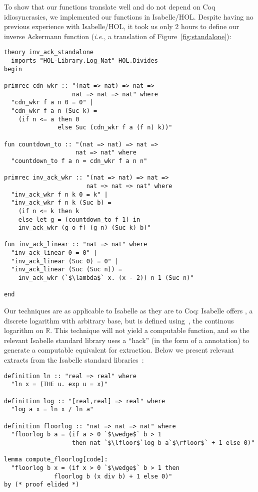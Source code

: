 To show that our functions translate well and do not 
depend on Coq idiosyncrasies,
we implemented our functions in Isabelle/HOL.  Despite having 
no previous experience with Isabelle/HOL, it took us
only 2 hours to define our inverse Ackermann function (\emph{i.e.}, a translation of Figure~\ref{fig:standalone}):
\lstset{style=isaStyle}
\begin{lstlisting}
theory inv_ack_standalone
  imports "HOL-Library.Log_Nat" HOL.Divides
begin

primrec cdn_wkr :: "(nat => nat) => nat => 
                   nat => nat => nat" where
  "cdn_wkr f a n 0 = 0" |
  "cdn_wkr f a n (Suc k) = 
    (if n <= a then 0 
  	           else Suc (cdn_wkr f a (f n) k))"

fun countdown_to :: "(nat => nat) => nat => 
                    nat => nat" where
  "countdown_to f a n = cdn_wkr f a n n"

primrec inv_ack_wkr :: "(nat => nat) => nat => 
                       nat => nat => nat" where
  "inv_ack_wkr f n k 0 = k" |
  "inv_ack_wkr f n k (Suc b) = 
  	(if n <= k then k
  	else let g = (countdown_to f 1) in
    inv_ack_wkr (g o f) (g n) (Suc k) b)"

fun inv_ack_linear :: "nat => nat" where
  "inv_ack_linear 0 = 0" |
  "inv_ack_linear (Suc 0) = 0" |
  "inv_ack_linear (Suc (Suc n)) = 
  	inv_ack_wkr (`$\lambda$` x. (x - 2)) n 1 (Suc n)"
 
end
\end{lstlisting}


Our techniques are as applicable to Isabelle as they are to Coq:
Isabelle offers , a discrete logarithm with arbitrary base, but 
 is defined using~, the continous logarithm on $\mathbb{R}$.
This technique will not yield a computable function, and so the relevant 
Isabelle standard library
uses a ``hack'' (in the form of a \li{[code]} annotation) to generate a computable equivalent for extraction.
Below we present relevant extracts from the Isabelle standard libraries~\cite{isastan2013, isastan2019}:
\begin{lstlisting}
definition ln :: "real => real" where
  "ln x = (THE u. exp u = x)"

definition log :: "[real,real] => real" where
  "log a x = ln x / ln a"

definition floorlog :: "nat => nat => nat" where
  "floorlog b a = (if a > 0 `$\wedge$` b > 1 
                   then nat `$\lfloor$`log b a`$\rfloor$` + 1 else 0)"

lemma compute_floorlog[code]:
  "floorlog b x = (if x > 0 `$\wedge$` b > 1 then 
              floorlog b (x div b) + 1 else 0)"
by (* proof elided *)
\end{lstlisting}

